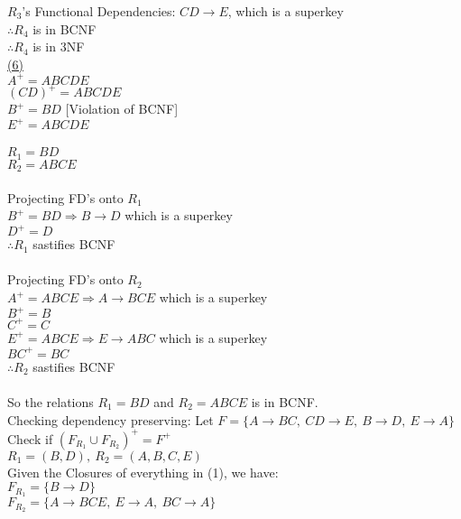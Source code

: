\documentclass[12pt]{article}
\begin{document}
$R_3$'s Functional Dependencies: $CD\rightarrow E$, which is a superkey\\
$\therefore R_4$ is in BCNF\\
$\therefore R_4$ is in 3NF\\
\newpage
\noindent \hyperlink{toc}{\hypertarget{6.6}{(6)}}\\
$A^+ = ABCDE$\\
$(CD)^+ = ABCDE$\\
$B^+ = BD$ [Violation of BCNF]\\
$E^+ = ABCDE$\\\\

$R_1 = BD$\\
$R_2 = ABCE$\\\\

Projecting FD's onto $R_1$\\
$B^+ = BD \Longrightarrow B \rightarrow D$ which is a superkey\\
$D^+ = D$\\
$\therefore R_1$ sastifies BCNF\\\\

Projecting FD's onto $R_2$\\
$A^+ = ABCE \Longrightarrow A \rightarrow BCE$ which is a superkey\\
$B^+ = B$\\
$C^+ = C$\\
$E^+ = ABCE \Longrightarrow E \rightarrow ABC$ which is a superkey\\
$BC^+ = BC$\\
$\therefore R_2$ sastifies BCNF\\\\

So the relations $R_1 = BD$ and $R_2 = ABCE$ is in BCNF.\\

Checking dependency preserving: Let $F=\{A\rightarrow BC,\ CD \rightarrow E,\ B \rightarrow D,\ E \rightarrow A\}$
Check if $(F_{R_1} \cup F_{R_2})^+ = F^+$\\

$R_1 = (B, D),\ R_2 = (A, B, C, E)$\\

Given the Closures of everything in (1), we have:\\
$F_{R_1} = \{B \rightarrow D\}$\\
$F_{R_2} = \{A \rightarrow BCE,\ E \rightarrow A,\ BC \rightarrow A\}$\\
\end{document}
